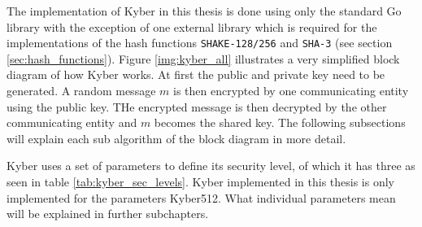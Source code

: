 The implementation of Kyber in this thesis is done using only the standard Go library with the exception of one external library \cite{00fV2cvg7Z6H2tS3} which is required for the implementations of the hash functions \texttt{SHAKE-128/256} and \texttt{SHA-3} (see section \ref{sec:hash_functions}). Figure \ref{img:kyber_all} illustrates a very simplified block diagram of how Kyber works. At first the public and private key need to be generated. A random message $m$ is then encrypted by one communicating entity using the public key. THe encrypted message is then decrypted by the other communicating entity and $m$ becomes the shared key. The following subsections will explain each sub algorithm of the block diagram in more detail.

Kyber uses a set of parameters to define its security level, of which it has three as seen in table \ref{tab:kyber_sec_levels}. Kyber implemented in this thesis is only implemented for the parameters Kyber512. What individual parameters mean will be explained in further subchapters.

